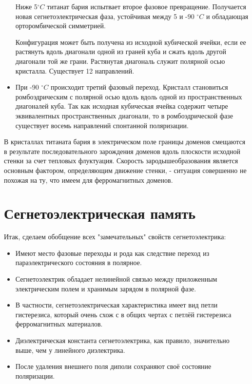 \documentclass[a4paper]{article}
\begin{document}
\begin{itemize}
Ниже 5$^{\circ} C$ титанат бария испытвает второе фазовое превращение. Получается новая сегнетоэлектрическая фаза, устойчивая между 5 и -90 $^{\circ} C$ и обладающая орторомбической симметрией. 

Конфигурация может быть получена из исходной кубической ячейки, если ее растянуть вдоль диагонали одной из граней куба и сжать вдоль другой диагонали той же грани. Растянутая диагональ служит полярной осью кристалла. Существует 12 направлений. 

\item

При -90 $^{\circ} C$ происходит третий фазовый переход. Кристалл становиться ромбоэдрическим с полярной осью вдоль вдоль одной из пространственных диагоналей куба. Так как исходная кубическая ячейка содержит четыре эквивалентных пространственных диагонали, то в ромбоэдрической фазе существует восемь направлений спонтанной поляризации. 

\end{itemize}

В кристаллах титаната бария в электрическом поле границы доменов смещаются в результате последовательного зарождения доменов вдоль плоскости исходной стенки за счет тепловых флуктуация. Скорость зародышеобразования является основным фактором, определяющим движение стенки, - ситуация совершенно не похожая на ту, что имеем для ферромагнитных доменов. 

\section{Сегнетоэлектрическая память}

Итак, сделаем обобщение всех "замечательных" свойств сегнетоэлектрика:
\begin{itemize}

\item

Имеют место фазовые переходы  и  рода как следствие переход из параэлектрического состояния в полярное. 

\item

Сегнетоэлектрик обладает нелинейной связью между приложенным электрическим полем и хранимым зарядом в полярной фазе.
 
\item

В частности, сегнетоэлектрическая характеристика имеет вид петли гистерезиса, который очень схож с в общих чертах с петлёй гистерезиса ферромагнитных материалов. 

\item

Диэлектрическая константа сегнетоэлектрика, как правило, значительно выше, чем у линейного диэлектрика. 

\item

После удаления внешнего поля диполи сохраняют своё состояние поляризации. 

\end{itemize}
\end{document}
